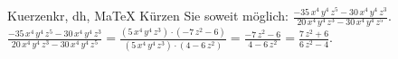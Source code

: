 \begin{MAufgabe}{Kuerzen}{kr, dh, MaTeX}
K\"urzen Sie soweit m\"oglich: $\frac{ - 35\, x^4\, y^4\, z^5 - 30\, x^4\, y^4\, z^3}{20\, x^4\, y^4\, z^3 - 30\, x^4\, y^4\, z^5}$.\\ 
\ifLsg\MLoesung
\quad $\frac{ - 35\, x^4\, y^4\, z^5 - 30\, x^4\, y^4\, z^3}{20\, x^4\, y^4\, z^3 - 30\, x^4\, y^4\, z^5}=\frac{(5\, x^4\, y^4\, z^3)\cdot( - 7\, z^2 - 6)}{(5\, x^4\, y^4\, z^3)\cdot(4 - 6\, z^2)}=\frac{ - 7\, z^2 - 6}{4 - 6\, z^2}=\frac{7\, z^2 + 6}{6\, z^2 - 4}$.\else\relax\fi
 \end{MAufgabe}